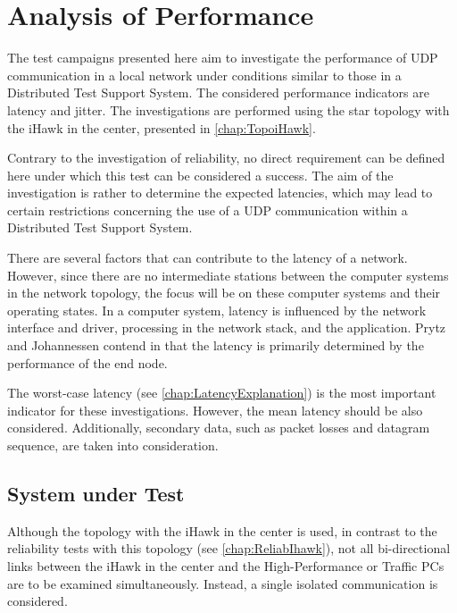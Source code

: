 \chapter{Analysis of Performance} \label{chap:perfAnalysis}
The test campaigns presented here aim to investigate the performance of UDP communication in a local network under conditions similar to those in a Distributed Test Support System. The considered performance indicators are latency and jitter. The investigations are performed using the star topology with the iHawk in the center, presented in \ref{chap:TopoiHawk}.

Contrary to the investigation of reliability, no direct requirement can be defined here under which this test can be considered a success. The aim of the investigation is rather to determine the expected latencies, which may lead to certain restrictions concerning the use of a UDP communication within a Distributed Test Support System.

There are several factors that can contribute to the latency of a network. However, since there are no intermediate stations between the computer systems in the network topology, the focus will be on these computer systems and their operating states. In a computer system, latency is influenced by the network interface and driver, processing in the network stack, and the application. Prytz and Johannessen contend in \cite{perfnew01} that the latency is primarily determined by the performance of the end node.

The worst-case latency (see \ref{chap:LatencyExplanation}) is the most important indicator for these investigations. However, the mean latency should be also considered. Additionally, secondary data, such as packet losses and datagram sequence, are taken into consideration.

\section{System under Test}
Although the topology with the iHawk in the center is used, in contrast to the reliability tests with this topology (see \ref{chap:ReliabIhawk}), not all bi-directional links between the iHawk in the center and the High-Performance or Traffic PCs are to be examined simultaneously. Instead, a single isolated communication is considered.

